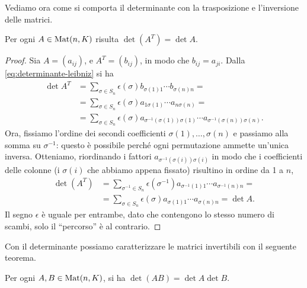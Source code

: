 Vediamo ora come si comporta il determinante con la trasposizione e l'inversione delle matrici.
\begin{teorema} \label{t:determinante-trasposta}
	Per ogni $A\in\operatorname{Mat}(n,K)$ risulta $\det(A^T)=\det A$.
\end{teorema}
	\begin{proof}
	Sia $A=(a_{ij})$, e $A^T=(b_{ij})$, in modo che $b_{ij}=a_{ji}$.
	Dalla \eqref{eq:determinante-leibniz} si ha
	\begin{equation}
		\begin{split}
			\det A^T &=\sum_{\sigma\in S_n}\epsilon(\sigma)b_{\sigma(1)1}\cdots b_{\sigma(n)n}=\\
			&=\sum_{\sigma\in S_n}\epsilon(\sigma)a_{1\sigma(1)}\cdots a_{n\sigma(n)}=\\
			&=\sum_{\sigma\in S_n}\epsilon(\sigma)a_{\sigma^{-1}(\sigma(1))\sigma(1)}\cdots a_{\sigma^{-1}(\sigma(n))\sigma(n)}.
		\end{split}
	\end{equation}
	Ora, fissiamo l'ordine dei secondi coefficienti $\sigma(1),\dots,\sigma(n)$ e passiamo alla somma su $\sigma^{-1}$: questo è possibile perch\'e ogni permutazione ammette un'unica inversa.
	Otteniamo, riordinando i fattori $a_{\sigma^{-1}(\sigma(i))\sigma(i)}$ in modo che i coefficienti delle colonne (i $\sigma(i)$ che abbiamo appena fissato) risultino in ordine da 1 a $n$,
	\begin{equation}
		\begin{split}
			\det(A^T)&=\sum_{\sigma^{-1}\in S_n}\epsilon(\sigma^{-1})a_{\sigma^{-1}(1)1}\cdots a_{\sigma^{-1}(n)n}=\\
			&=\sum_{\sigma\in S_n}\epsilon(\sigma)a_{\sigma(1)1}\cdots a_{\sigma(n)n}=\det A.
		\end{split}
	\end{equation}
	Il segno $\epsilon$ è uguale per entrambe, dato che contengono lo stesso numero di scambi, solo il ``percorso'' è al contrario.
\end{proof}
Con il determinante possiamo caratterizzare le matrici invertibili con il seguente teorema.
\begin{teorema}[di Binet] \label{t:binet}
	Per ogni $A,B\in\operatorname{Mat}(n,K)$, si ha $\det(AB)=\det A\det B$.
\end{teorema}
